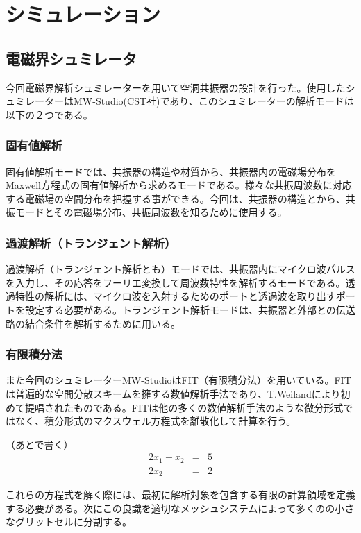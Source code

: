 \chapter{シミュレーション}

\section{電磁界シュミレータ}
今回電磁界解析シュミレーターを用いて空洞共振器の設計を行った。使用したシュミレーターはMW-Studio(CST社)\cite{CST}であり、このシュミレーターの解析モードは以下の２つである。\cite{MWS-1}

\subsection{固有値解析}
固有値解析モードでは、共振器の構造や材質から、共振器内の電磁場分布をMaxwell方程式の固有値解析から求めるモードである。様々な共振周波数に対応する電磁場の空間分布を把握する事ができる。今回は、共振器の構造とから、共振モードとその電磁場分布、共振周波数を知るために使用する。

\subsection{過渡解析（トランジェント解析）}
過渡解析（トランジェント解析とも）モードでは、共振器内にマイクロ波パルスを入力し、その応答をフーリエ変換して周波数特性を解析するモードである。透過特性の解析には、マイクロ波を入射するためのポートと透過波を取り出すポートを設定する必要がある。トランジェント解析モードは、共振器と外部との伝送路の結合条件を解析するために用いる。

\subsection{有限積分法}
また今回のシュミレーターMW-StudioはFIT（有限積分法）を用いている。\cite{MWS-2}FITは普遍的な空間分散スキームを擁する数値解析手法であり、T.Weilandにより初めて提唱されたものである。FITは他の多くの数値解析手法のような微分形式ではなく、積分形式のマクスウェル方程式を離散化して計算を行う。


（あとで書く）
\begin{eqnarray}
  2x_1 + x_2 & = & 5 \\
  2x_2 & = & 2
\end{eqnarray}

これらの方程式を解く際には、最初に解析対象を包含する有限の計算領域を定義する必要がある。次にこの良識を適切なメッシュシステムによって多くのの小さなグリットセルに分割する。

